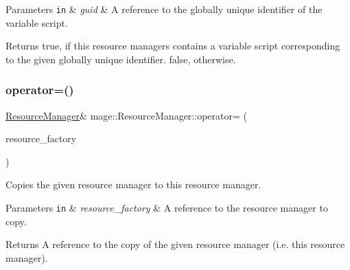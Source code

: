 \begin{DoxyParams}[1]{Parameters}
\mbox{\tt in}  & {\em guid} & A reference to the globally unique identifier of the variable script. \\
\hline
\end{DoxyParams}
\begin{DoxyReturn}{Returns}
{\ttfamily true}, if this resource managers contains a variable script corresponding to the given globally unique identifier. {\ttfamily false}, otherwise. 
\end{DoxyReturn}
\hypertarget{classmage_1_1_resource_manager_a20dccd5bdf541990ec4db7819adc6cdb}{}\label{classmage_1_1_resource_manager_a20dccd5bdf541990ec4db7819adc6cdb} 
\subsubsection{\texorpdfstring{operator=()}{operator=()}\hspace{0.1cm}{\footnotesize\ttfamily [1/2]}}
{\footnotesize\ttfamily \hyperlink{classmage_1_1_resource_manager}{Resource\+Manager}\& mage\+::\+Resource\+Manager\+::operator= (\begin{DoxyParamCaption}\item[{const \hyperlink{classmage_1_1_resource_manager}{Resource\+Manager} \&}]{resource\+\_\+factory }\end{DoxyParamCaption})\hspace{0.3cm}{\ttfamily [delete]}}

Copies the given resource manager to this resource manager.


\begin{DoxyParams}[1]{Parameters}
\mbox{\tt in}  & {\em resource\+\_\+factory} & A reference to the resource manager to copy. \\
\hline
\end{DoxyParams}
\begin{DoxyReturn}{Returns}
A reference to the copy of the given resource manager (i.\+e. this resource manager). 
\end{DoxyReturn}
\hypertarget{classmage_1_1_resource_manager_a0a418c5753af2b4a0a868801f3145f0a}{}\label{classmage_1_1_resource_manager_a0a418c5753af2b4a0a868801f3145f0a} 
